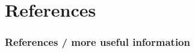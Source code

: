 \documentclass{beamer}
\begin{document}
\section{References}
\begin{frame}
  \frametitle{References / more useful information}
  \begin{tabular}{ | l | p{5cm} |}
  \end{tabular}
\end{frame}
\end{document}
